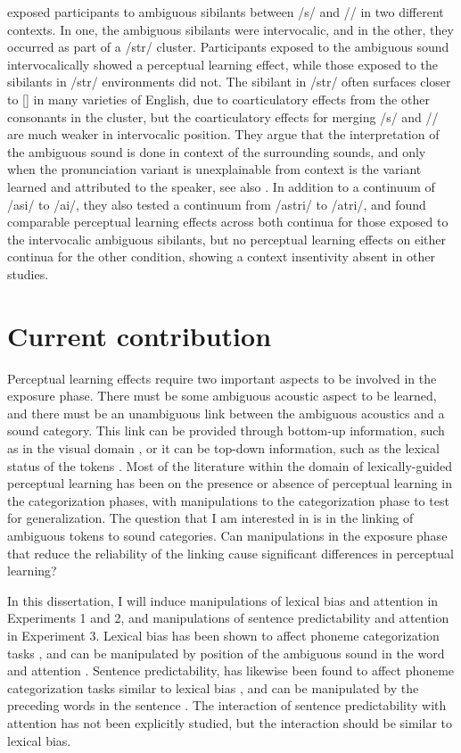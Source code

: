 \citet{Kraljic2008a} exposed participants to ambiguous sibilants between /s/ and /\textesh/ in two different contexts.  
In one, the ambiguous sibilants were intervocalic, and in the other, they occurred as part of a /str/ cluster.  
Participants exposed to the ambiguous sound intervocalically showed a perceptual learning effect, while those exposed to the sibilants in /str/ environments did not.  
The sibilant in /str/ often surfaces closer to [\textesh] in many varieties of English, due to coarticulatory effects from the other consonants in the cluster, but the coarticulatory effects for merging /s/ and /\textesh/ are much weaker in intervocalic position.  
They argue that the interpretation of the ambiguous sound is done in context of the surrounding sounds, and only when the pronunciation variant is unexplainable from context is the variant learned and attributed to the speaker, see also \citet{Kraljic2008}.  
In addition to a continuum of /asi/ to /a\textesh i/, they also tested a continuum from /astri/ to /a\textesh tri/, and found comparable perceptual learning effects across both continua for those exposed to the intervocalic ambiguous sibilants, but no perceptual learning effects on either continua for the other condition, showing a context insentivity absent in other studies.

\section{Current contribution}

Perceptual learning effects require two important aspects to be involved in the exposure phase.  
There must be some ambiguous acoustic aspect to be learned, and there must be an unambiguous link between the ambiguous acoustics and a sound category. 
This link can be provided through bottom-up information, such as in the visual domain \citep{Bertelson2003}, or it can be top-down information, such as the lexical status of the tokens \citep{Norris2003}. 
Most of the literature within the domain of lexically-guided perceptual learning has been on the presence or absence of perceptual learning in the categorization phases, with manipulations to the categorization phase to test for generalization.  
The question that I am interested in is in the linking of ambiguous tokens to sound categories.  
Can manipulations in the exposure phase that reduce the reliability of the linking cause significant differences in perceptual learning?

In this dissertation,  I will induce manipulations of lexical bias and attention in Experiments 1 and 2, and manipulations of sentence predictability and attention in Experiment 3. 
Lexical bias has been shown to affect phoneme categorization tasks \citep{Ganong1980}, and can be manipulated by position of the ambiguous sound in the word and attention \cite{Pitt2012}.  
Sentence predictability, has likewise been found to affect phoneme categorization tasks similar to lexical bias \citep{Borsky1998}, and can be manipulated by the preceding words in the sentence \citep{Kalikow1977}.  
The interaction of sentence predictability with attention has not been explicitly studied, but the interaction should be similar to lexical bias.
